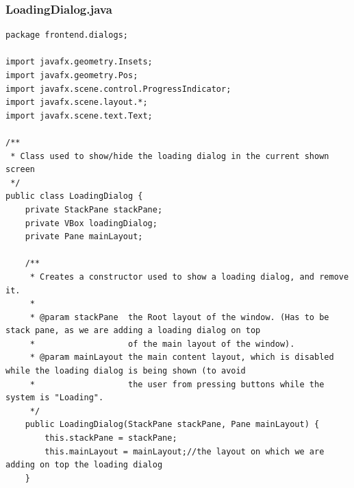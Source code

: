 \subsubsection{LoadingDialog.java}
\begin{lstlisting}
package frontend.dialogs;

import javafx.geometry.Insets;
import javafx.geometry.Pos;
import javafx.scene.control.ProgressIndicator;
import javafx.scene.layout.*;
import javafx.scene.text.Text;

/**
 * Class used to show/hide the loading dialog in the current shown screen
 */
public class LoadingDialog {
    private StackPane stackPane;
    private VBox loadingDialog;
    private Pane mainLayout;

    /**
     * Creates a constructor used to show a loading dialog, and remove it.
     *
     * @param stackPane  the Root layout of the window. (Has to be stack pane, as we are adding a loading dialog on top
     *                   of the main layout of the window).
     * @param mainLayout the main content layout, which is disabled while the loading dialog is being shown (to avoid
     *                   the user from pressing buttons while the system is "Loading".
     */
    public LoadingDialog(StackPane stackPane, Pane mainLayout) {
        this.stackPane = stackPane;
        this.mainLayout = mainLayout;//the layout on which we are adding on top the loading dialog
    }


\end{lstlisting}
